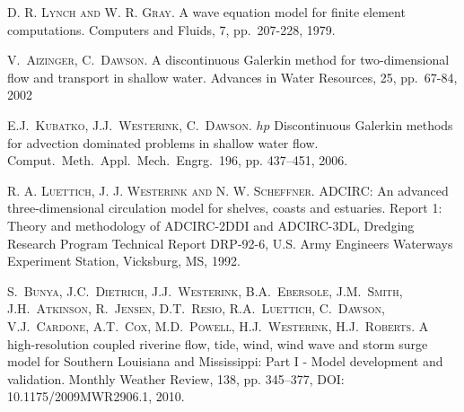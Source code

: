 
\begin{thebibliography}{10}
\textsc{D. R. Lynch and W. R. Gray}. {A wave equation model for finite element computations}. Computers and Fluids, 7, pp.\ 207-228, 1979.  

\textsc{V.~Aizinger, C.~Dawson}. {A discontinuous Galerkin method for two-dimensional flow and transport in shallow water}. Advances in Water Resources, 25, pp.\ 67-84, 2002

\textsc{E.J.~Kubatko, J.J.~Westerink, C.~Dawson}. {$hp$ Discontinuous Galerkin methods for advection dominated problems in shallow water flow}. Comput.~Meth.~Appl.~Mech.~Engrg.~196, pp. 437--451, 2006.

\textsc{R. A. Luettich, J. J. Westerink and N. W. Scheffner}. {ADCIRC: An advanced three-dimensional circulation model for shelves, coasts and estuaries}. Report 1: Theory and methodology of ADCIRC-2DDI and ADCIRC-3DL, Dredging Research Program Technical Report DRP-92-6, U.S. Army Engineers Waterways Experiment Station, Vicksburg, MS, 1992.  


\textsc{S.~Bunya, J.C.~Dietrich, J.J.~Westerink, B.A.~Ebersole, J.M.~Smith,  J.H.~Atkinson, R.~Jensen, D.T.~Resio, R.A.~Luettich, C.~Dawson, V.J.~Cardone, A.T.~Cox, M.D.~Powell, H.J.~Westerink, H.J.~Roberts}. {A high-resolution coupled riverine flow, tide, wind, wind wave and storm surge model for Southern Louisiana and Mississippi: Part I - Model development and validation}. Monthly Weather Review, 138, pp. 345--377, DOI: 10.1175/2009MWR2906.1, 2010.  




\end{thebibliography}
